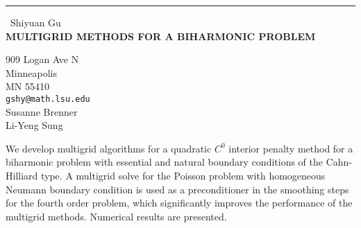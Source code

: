 \documentclass{report}
\begin{document}
\begin{center}
\rule{6in}{1pt} \
{\large Shiyuan Gu \\
{\bf MULTIGRID METHODS FOR A BIHARMONIC PROBLEM}}

909 Logan Ave N \\ Minneapolis \\ MN 55410
\\
{\tt gshy@math.lsu.edu}\\
Susanne Brenner\\
Li-Yeng Sung\end{center}

We develop multigrid algorithms for a quadratic $C^0$ interior penalty
method for a biharmonic problem with essential and natural boundary
conditions of the Cahn-Hilliard type. A multigrid solve for the Poisson
problem with homogeneous Neumann boundary condition is used as a
preconditioner in the smoothing steps for the fourth order problem, which
significantly improves the performance of the multigrid methods.
Numerical results are presented.
\end{document}
